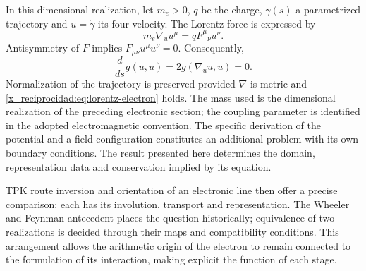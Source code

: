 In this dimensional realization, let \(m_e>0\), \(q\) be the charge,
\(\gamma(s)\) a parametrized trajectory and \(u=\dot\gamma\)
its four-velocity. The Lorentz force is expressed by
\begin{equation}
 m_e\nabla_u u^\mu=qF^\mu{}_{\nu}u^\nu.
 \label{x_reciprocidad:eq:lorentz-electron}
\end{equation}
Antisymmetry of \(F\) implies
\(F_{\mu\nu}u^\mu u^\nu=0\). Consequently,
\[
 \frac{d}{ds}g(u,u)=2g(\nabla_u u,u)=0.
\]
Normalization of the trajectory is preserved provided \(\nabla\)
is metric and \eqref{x_reciprocidad:eq:lorentz-electron} holds. The mass used
is the dimensional realization of the preceding electronic section;
the coupling parameter is identified in the adopted electromagnetic
convention. The specific derivation of the potential and a field
configuration constitutes an additional problem with its own boundary
conditions. The result presented here determines the domain, representation
data and conservation implied by its equation.

TPK route inversion and orientation of an electronic line
then offer a precise comparison: each has its involution,
transport and representation. The Wheeler and Feynman antecedent
places the question historically; equivalence of two realizations
is decided through their maps and compatibility conditions.
This arrangement allows the arithmetic origin of the electron to remain connected
to the formulation of its interaction, making explicit the function
of each stage.



